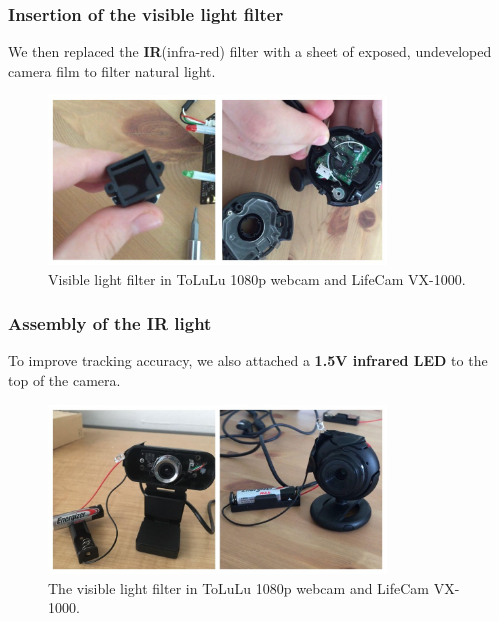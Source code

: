 \documentclass{beamer}
\begin{document}
    \begin{frame}
        \frametitle{Insertion of the visible light filter}
        \center

        We then replaced the \textbf{IR}(infra-red) filter with a sheet of
        exposed, undeveloped camera film to filter natural light.

        \begin{figure}
            \begin{center}
                \includegraphics[width=0.8\textwidth]{VL_cameras.jpg}
            \end{center}
            \caption{Visible light filter in ToLuLu 1080p webcam and LifeCam
            VX-1000.}
            \label{fig:VL_cameras}
        \end{figure}

    \end{frame}

    \begin{frame}
        \frametitle{Assembly of the IR light}
        \center
        To improve tracking accuracy, we also attached a \textbf{1.5V infrared
        LED} to the top of the camera.

        \begin{figure}
            \begin{center}
                \includegraphics[width=0.8\textwidth]{IR_cameras.jpg}
            \end{center}
            \caption{The visible light filter in ToLuLu 1080p webcam
            and LifeCam VX-1000.}
            \label{fig:IR_cameras}
        \end{figure}

    \end{frame}
\end{document}
